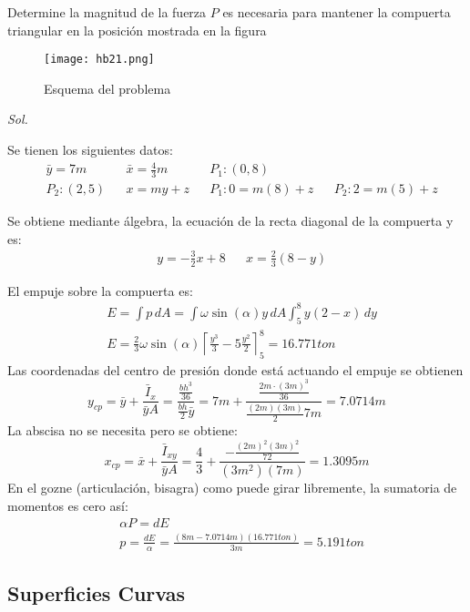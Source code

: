 \begin{problem}
    Determine la magnitud de la fuerza $P$ es necesaria para mantener la compuerta triangular en la posición mostrada en la figura
\end{problem}

\begin{figure}[h!]
\centering
  \texttt{[image: hb21.png]}
  \caption{Esquema del problema}
  \label{hb21}
\end{figure}

\textit{ Sol. }

Se tienen los siguientes datos:
\begin{align*}
    &\bar{y}=7m&&\bar{x}=\frac{4}{3}m&&P_1:(0,8)\\
    &P_2:(2,5)&&x=my+z&&P_1:0=m(8)+z&&P_2:2=m(5)+z
\end{align*}

Se obtiene mediante álgebra, la ecuación de la recta diagonal de la compuerta y es: 
\begin{align*}
    &y=-\frac{3}{2}x+8&&x=\frac{2}{3}(8-y)
\end{align*}

El empuje sobre la compuerta es:
    \begin{align*}
        &E=\int p\, dA=\int \omega\sin{(\alpha)}y\, dA\int_5^8y(2-x)\, dy\\
        &E=\frac{2}{3}\omega\sin{(\alpha)}\left\lceil \frac{y^3}{3}-5\frac{y^2}{2}\right\rceil_5^8=16.771ton
    \end{align*}
Las coordenadas del centro de presión donde está actuando el empuje se obtienen
\begin{equation*}
    y_{cp}=\bar{y}+\frac{\bar{I}_x}{\bar{y}A}=\frac{\frac{bh^3}{36}}{\frac{bh}{2}\bar{y}}=7m+\frac{\frac{2m\cdot (3m)^3}{36}}{\frac{(2m)(3m)}{2}7m}=7.0714m
\end{equation*}
La abscisa no se necesita pero se obtiene:
\begin{equation*}
    x_{cp}=\bar{x}+\frac{\bar{I}_{xy}}{\bar{y}A}=\frac{4}{3}+\frac{-\frac{(2m)^2(3m)^2}{72}}{(3m^2)(7m)}=1.3095m
\end{equation*}
En el gozne (articulación, bisagra) como puede girar libremente, la sumatoria de momentos es cero así:
\begin{align*}
    &\alpha P=dE\\
    &p=\frac{dE}{\alpha}=\frac{(8m-7.0714m)(16.771ton)}{3m}=5.191ton
\end{align*}

\subsection{Superficies Curvas}

